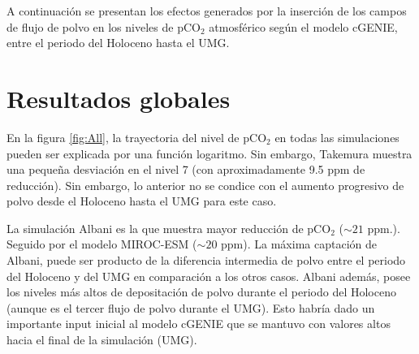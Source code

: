
A continuación se presentan los efectos generados por la inserción de los campos de flujo de polvo en los niveles de pCO$_2$ atmosférico según el modelo cGENIE, entre el periodo del Holoceno hasta el UMG. 

\section{Resultados globales}

En la figura \ref{fig:All}, la trayectoria del nivel de pCO$_2$ en todas las simulaciones pueden ser explicada por una función logaritmo. Sin embargo, Takemura muestra una pequeña desviación en el nivel 7 (con aproximadamente 9.5 ppm de reducción). Sin embargo, lo anterior no se condice con el aumento progresivo de polvo desde el Holoceno hasta el UMG para este caso. 

La simulación Albani es la que muestra mayor reducción de pCO$_2$ ($\sim 21$ ppm.). Seguido por el modelo MIROC-ESM ($\sim 20$ ppm). La máxima captación de Albani, puede ser producto de la diferencia intermedia de polvo entre el periodo del Holoceno y del UMG en comparación a los otros casos. Albani además, posee los niveles más altos de depositación de polvo durante el periodo del Holoceno (aunque es el tercer flujo de polvo durante el UMG). Esto habría dado un importante input inicial al modelo cGENIE que se mantuvo con valores altos hacia el final de la simulación (UMG). \newpage

